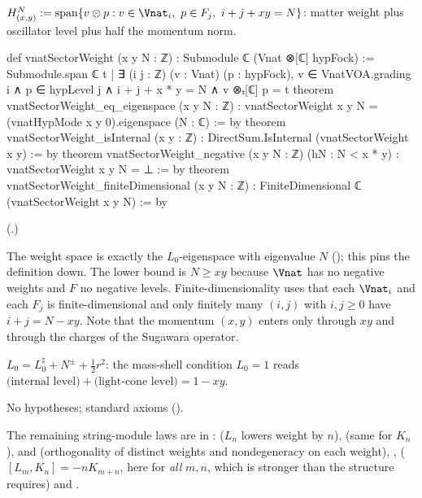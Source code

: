 \begin{definition}\label{ch18:def:sectorweight}
$H^N_{(x,y)}:=\operatorname{span}\{v\otimes p: v\in\Vnat_i,\ p\in F_j,\ i+j+xy=N\}$: matter weight plus
oscillator level plus half the momentum norm.
\end{definition}
\begin{leancode}
def vnatSectorWeight (x y N : ℤ) : Submodule ℂ (Vnat ⊗[ℂ] hypFock) :=
  Submodule.span ℂ {t | ∃ (i j : ℤ) (v : Vnat) (p : hypFock),
    v ∈ VnatVOA.grading i ∧ p ∈ hypLevel j ∧ i + j + x * y = N ∧ v ⊗ₜ[ℂ] p = t}
theorem vnatSectorWeight_eq_eigenspace (x y N : ℤ) :
    vnatSectorWeight x y N = (vnatHypMode x y 0).eigenspace (N : ℂ) := by
theorem vnatSectorWeight_isInternal (x y : ℤ) :
    DirectSum.IsInternal (vnatSectorWeight x y) := by
theorem vnatSectorWeight_negative (x y N : ℤ) (hN : N < x * y) :
    vnatSectorWeight x y N = ⊥ := by
theorem vnatSectorWeight_finiteDimensional (x y N : ℤ) :
    FiniteDimensional ℂ (vnatSectorWeight x y N) := by
\end{leancode}
(.)
\begin{dictionary}
The weight space is exactly the $L_0$-eigenspace with eigenvalue $N$ (); this
pins the definition down.  The lower bound is $N\ge xy$ because $\Vnat$ has no negative weights and $F$ no
negative levels.  Finite-dimensionality uses that each $\Vnat_i$ and each $F_j$ is finite-dimensional and
only finitely many $(i,j)$ with $i,j\ge0$ have $i+j=N-xy$.  Note that the momentum $(x,y)$ enters only
through $xy$ and through the charges of the Sugawara operator.
\end{dictionary}
\begin{physics}
$L_0=L_0^\natural+N^{\pm}+\frac12r^2$: the mass-shell condition $L_0=1$ reads
$\text{(internal level)}+\text{(light-cone level)}=1-xy$.
\end{physics}
\begin{status}No hypotheses; standard axioms ().\end{status}

The remaining string-module laws are in :
 ($L_n$ lowers weight by $n$),  (same for
$K_n$),  and  (orthogonality of
distinct weights and nondegeneracy on each weight), ,
 ($[L_m,K_n]=-nK_{m+n}$, here for \emph{all} $m,n$, which is stronger
than the structure requires) and .

